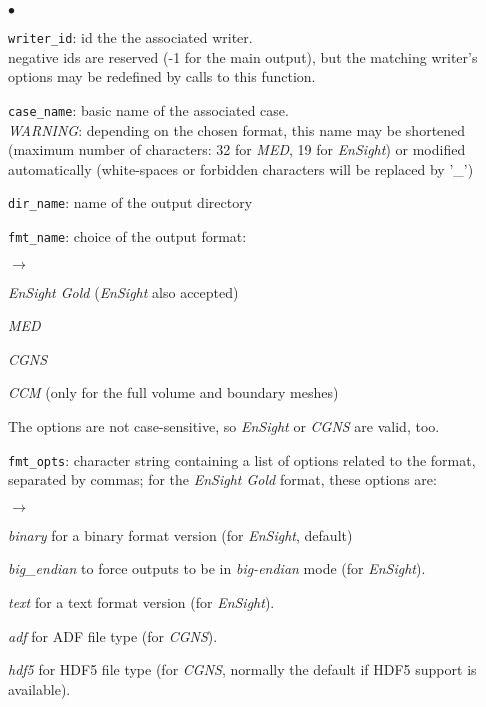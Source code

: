 {{{\begin{list}{$\bullet$}{}
       \item \texttt{writer\_id}: id the the associated writer.\\
             negative ids are reserved (-1 for the main output),
             but the matching writer's options may be redefined by
             calls to this function.
       \item \texttt{case\_name}: basic name of the associated case.\\ {\em
             WARNING}: depending on the chosen format, this name may
             be shortened (maximum number of characters: 32 for {\em MED},
             19 for {\em EnSight}) or modified automatically (white-spaces or
             forbidden characters will be replaced by '\_')
       \item \texttt{dir\_name}: name of the output directory
       \item \texttt{fmt\_name}: choice of the output format:
        \begin{list}{$\rightarrow$}{}
               \item {\em EnSight Gold} ({\em EnSight} also accepted)
               \item {\em MED}
               \item {\em CGNS}
               \item {\em CCM} (only for the full volume and boundary meshes)
         \end{list}
The options are not case-sensitive, so {\em EnSight} or {\em CGNS} are valid, too.
       \item \texttt{fmt\_opts}: character string containing a list of
             options related to the format, separated by commas; for the
             {\em EnSight Gold} format, these options are:
        \begin{list}{$\rightarrow$}{}
               \item {\em binary} for a binary format version (for {\em EnSight}, default)
               \item {\em big\_endian} to force outputs to be in {\em big-endian}
                 mode (for {\em EnSight}).
               \item {\em text} for a text format version (for {\em EnSight}).
               \item {\em adf} for ADF file type (for {\em CGNS}).
               \item {\em hdf5} for HDF5 file type (for {\em CGNS}, normally the
                 default if HDF5 support is available).

\end{list}
\end{list}}}}
